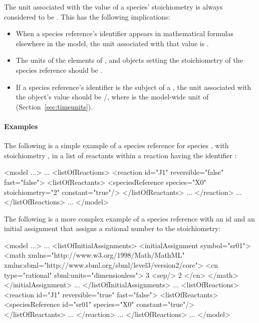 The unit associated with the value of a species' stoichiometry is
always considered to be .  This has the
following implications:
\begin{itemize}

\item When a species reference's identifier appears in
  mathematical formulas elsewhere in the model, the unit
  associated with that value is .

\item The units of the  elements of \AssignmentRule,
  \InitialAssignment and \EventAssignment objects setting the
  stoichiometry of the species reference should be
  .

\item If a species reference's identifier is the subject of a
  \RateRule, the unit associated with the \RateRule object's value
  should be /, where
   is the model-wide unit of 
  (Section~\ref{sec:timeunits}).

\end{itemize}


\paragraph{Examples}

The following is a simple example of a species reference for
species , with stoichiometry , in a list of
reactants within a reaction having the identifier :

\begin{example}
<model ...>
    ...
    <listOfReactions>
        <reaction id="J1" reversible="false" fast="false">
            <listOfReactants>
                <speciesReference species="X0" stoichiometry="2" constant="true"/>
            </listOfReactants>
            ...
        </reaction>
        ...
    </listOfReactions>
    ...
</model>
\end{example}

The following is a more complex example of a species reference
with an id  and an initial assignment that assigns a
rational number to the stoichiometry:

\begin{example}
<model ...>
    ...
    <listOfInitialAssignments>
        <initialAssignment symbol="sr01">
            <math xmlns="http://www.w3.org/1998/Math/MathML"
                  xmlns:sbml="http://www.sbml.org/sbml/level3/version2/core">
                <cn type="rational" sbml:units="dimensionless"> 3 <sep/> 2 </cn>
            </math>
        </initialAssignment>
        ...
    </listOfInitialAssignments>
        ...
    <listOfReactions>
        <reaction id="J1" reversible="true" fast="false">
            <listOfReactants>
                <speciesReference id="sr01" species="X0" constant="true"/>
            </listOfReactants>
            ...
        </reaction>
        ...
    </listOfReactions>
    ...
</model>
\end{example}



